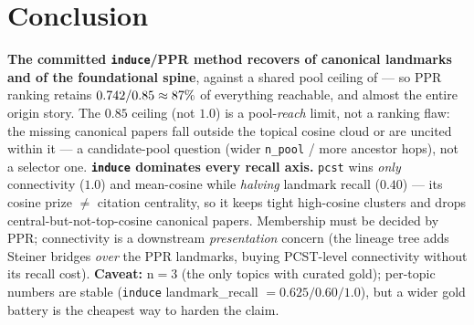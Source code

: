 \documentclass[11pt]{article}
\begin{document}
\section*{Conclusion}
\textbf{The committed \texttt{induce}/PPR method recovers \rcLandmark{} of canonical landmarks and
\rcSpine{} of the foundational spine}, against a shared pool ceiling of \rcPool{} --- so PPR ranking
retains $0.742/0.85 \approx 87\%$ of everything reachable, and almost the entire origin
story. The $0.85$ ceiling (not $1.0$) is a pool-\emph{reach} limit, not a ranking flaw: the missing
canonical papers fall outside the topical cosine cloud or are uncited within it --- a candidate-pool
question (wider \texttt{n\_pool} / more ancestor hops), not a selector one. \textbf{\texttt{induce}
dominates every recall axis.} \texttt{pcst} wins \emph{only} connectivity ($1.0$) and mean-cosine
while \emph{halving} landmark recall ($0.40$) --- its cosine prize $\neq$ citation centrality, so it
keeps tight high-cosine clusters and drops central-but-not-top-cosine canonical papers. Membership
must be decided by PPR; connectivity is a downstream \emph{presentation} concern (the lineage tree
adds Steiner bridges \emph{over} the PPR landmarks, buying PCST-level connectivity without its recall
cost). \textbf{Caveat:} n$=3$ (the only topics with curated gold); per-topic numbers are stable
(\texttt{induce} landmark\_recall $=0.625/0.60/1.0$), but a wider gold battery is the cheapest way to
harden the claim.
\end{document}
